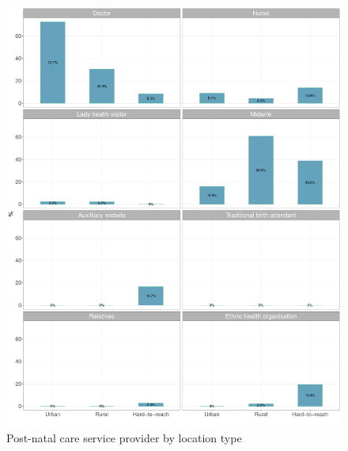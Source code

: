 \documentclass[12pt,a4paper]{article}
\begin{document}
\begin{figure}[H]

{\centering \includegraphics{kayahReport_files/figure-latex/pnc3Plot-1} 

}

\caption{Post-natal care service provider by location type}\label{fig:pnc3Plot}
\end{figure}
\end{document}
